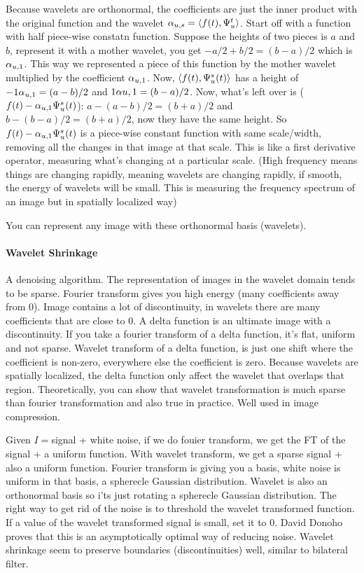 Because wavelets are orthonormal, the coefficients are just the inner
product with the original function and the wavelet $\alpha_{u,s} = \langle
f(t), \Psi_u^t \rangle$. Start off with a function with half piece-wise
constatn function. Suppose the heights of two pieces is $a$ and
$b$, represent it with a mother wavelet, you get $-a/2 + b/2 = (b-a)/2$ which is
$\alpha_{u,1}$. This way we represented a piece of this function by the
mother wavelet multiplied by the coefficient $\alpha_{u,1}$. Now, $\langle
f(t), \Psi_u^s(t)\rangle$
has a height of $-1\alpha_{u,1} = (a-b)/2$ and $1\alpha{u,1} = (b-a)/2$. Now,
what's left over is ($f(t) - \alpha_{u,1}\Psi_u^s(t)$): $a - (a-b)/2 = (b+a)/2$ and $b-(b-a)/2 = (b+a)/2$,
now they have the same height. 
So $f(t) - \alpha_{u,1}\Psi_u^s(t)$ is a piece-wise constant function
with same scale/width, removing all the changes in that image at that
scale. This is like a first derivative operator, measuring what's
changing at a particular scale. (High frequency means things are
changing rapidly, meaning wavelets are changing rapidly, if smooth,
the energy of wavelets will be small. This is
measuring the frequency spectrum of an image but in spatially
localized way)

You can represent any image with these orthonormal basis (wavelets). 

\paragraph{Wavelet Shrinkage}
\label{sec:wavelet-shrinkage}
A denoising algorithm. The representation of images in the wavelet
domain tends to be sparse. Fourier transform gives you high energy
(many coefficients away from 0). Image contains a lot of
discontinuity, in wavelets there are many coefficients that are close
to 0.
A delta function is an ultimate image with a discontinuity. If you
take a fourier transform of a delta function, it's flat, uniform and
not sparse. Wavelet transform of a delta function, is just one shift
where the coefficient is non-zero, everywhere else the coefficient is
zero. 
Because wavelets are spatially localized, the delta function only
affect the wavelet that overlaps that region.  Theoretically, you can
show that wavelet transformation is much sparse than fourier
transformation and also true in practice. Well used in image
compression.

Given $I=$signal + white noise, if we do fouier transform, we get the
FT of the signal + a uniform function. With wavelet transform, we get
a sparse signal + also a uniform function. Fourier transform is giving
you a basis, white noise is uniform in that basis, a spherecle
Gaussian distribution. Wavelet is also an
orthonormal basis so i'ts just rotating a spherecle Gaussian
distribution.
The right way to get rid of the noise is to threshold the wavelet
transformed function. If a value of the wavelet transformed signal is
small, set it to 0. David Donoho proves that this is an asymptotically optimal way of reducing
noise. 
Wavelet shrinkage seem to preserve boundaries (discontinuities) well,
similar to bilateral filter.

\pagebreak
\pagebreak
\pagebreak


